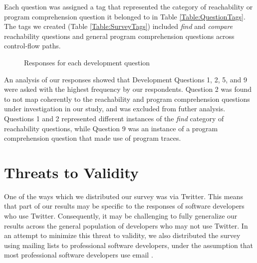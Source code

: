 \par Each question was assigned a tag that represented the category of
reachability or program comprehension question it belonged to in
Table \ref{Table:QuestionTags}.
The tags we created (Table \ref{Table:SurveyTags}) included \textit{find} 
and \textit{compare} reachability questions \cite{latoza-2010-reach} and general 
program comprehension questions across control-flow paths.



\begin{figure}[ht]
\centering
\caption{Responses for each development question}

\label{fig:SurveyResults}
\end{figure}

\par An analysis of our responses showed that Development Questions 1, 2, 5,
and 9 were asked with the highest frequency by our respondents.
Question 2 was found to not map coherently to the reachability and program
comprehension questions under investigation in our study, and was excluded
from futher analysis.
Questions 1 and 2 represented different instances of the \textit{find} category 
of reachability questions, while Question 9 was an instance of a program
comprehension question that made use of program traces.



\section{Threats to Validity}
\label{sec:ThreatsToValidity}


\noindent One of the ways which we distributed our survey was via Twitter.  
This means that part of our results may be specific to the responses of
software developers who use Twitter.
Consequently, it may be challenging to fully generalize our results across
the general population of developers who may not use Twitter.
In an attempt to minimize this threat to validity, we also distributed the 
survey using mailing lists to professional software developers, under the
assumption that most professional software developers use email
\cite{gousios-2016-work-practices}.


